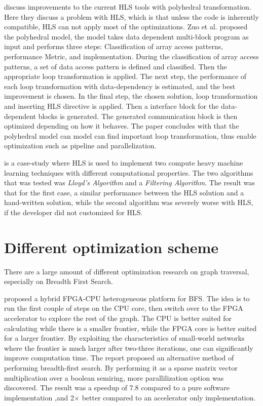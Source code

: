 \cite{Zuo:2013:IHL:2435264.2435271} discuss improvements to the current HLS tools with  polyhedral transformation. Here they discuss a problem with HLS, which is that unless the code is inherently compatible, HLS can not apply most of the optimizations. Zuo et al. proposed the polyhedral model, the model takes data dependent multi-block program as input and performs three steps: Classification of array access patterns, performance Metric, and implementation. During the classification of array access patterns, a set of data access pattern is defined and classified. Then the appropriate loop transformation is applied. The next step, the performance of each loop transformation with data-dependency is estimated, and the best improvement is chosen. In the final step, the chosen solution, loop transformation and inserting HLS directive is applied. Then a interface block for the data-dependent blocks is generated. The generated communication block is then optimized depending on how it behaves. The paper concludes with that the polyhedral model can model can find important loop transformation, thus enable optimization such as pipeline and parallelization.

\cite{6718388} is a case-study where HLS is used to implement two compute heavy machine learning techniques with different computational properties. The two algorithms that was tested was \textit{Lloyd's Algorithm} and a \textit{Filtering Algorithm}. The result was that for the first case, a similar performance between the HLS solution and a hand-written solution, while the second algorithm was severely worse with HLS, if the developer did not customized for HLS.
 
\section{Different optimization scheme}
There are a large amount of different optimization research on graph traversal, especially on Breadth First Search. 

\citep{HybridBFS2015} proposed a hybrid FPGA-CPU heterogeneous platform for BFS. The idea is to run the first couple of steps on the CPU core, then switch over to the FPGA accelerator to explore the rest of the graph. The CPU is better suited for calculating while there is a smaller frontier, while the FPGA core is better suited for a larger frontier. By exploiting the characteristics of small-world networks where the frontier is much larger after two-three iterations, one  can significantly improve computation time. The report proposed an alternative method of performing breadth-first search. By performing it as a sparse matrix vector multiplication over a boolean semiring, more parallilization option was discovered. The result was a speedup of 7.8 compared to a pure software implementation ,and 2$\times$ better compared to an accelerator only implementation. 
 
